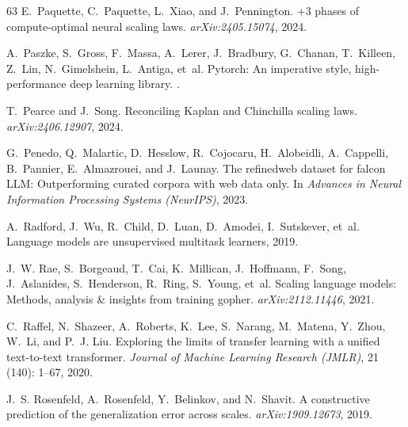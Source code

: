 \documentclass{article}
\theoremstyle{plain}
\theoremstyle{definition}
\theoremstyle{remark}
\begin{document}
\begin{thebibliography}{63}
E.~Paquette, C.~Paquette, L.~Xiao, and J.~Pennington.
+3 phases of compute-optimal neural scaling laws.
\newblock \emph{arXiv:2405.15074}, 2024.

A.~Paszke, S.~Gross, F.~Massa, A.~Lerer, J.~Bradbury, G.~Chanan, T.~Killeen, Z.~Lin, N.~Gimelshein, L.~Antiga, et~al.
\newblock Pytorch: An imperative style, high-performance deep learning library.
.

T.~Pearce and J.~Song.
\newblock Reconciling {K}aplan and {C}hinchilla scaling laws.
\newblock \emph{arXiv:2406.12907}, 2024.

G.~Penedo, Q.~Malartic, D.~Hesslow, R.~Cojocaru, H.~Alobeidli, A.~Cappelli, B.~Pannier, E.~Almazrouei, and J.~Launay.
\newblock The refinedweb dataset for falcon {LLM}: Outperforming curated corpora with web data only.
\newblock In \emph{Advances in Neural Information Processing Systems (NeurIPS)}, 2023.

A.~Radford, J.~Wu, R.~Child, D.~Luan, D.~Amodei, I.~Sutskever, et~al.
\newblock Language models are unsupervised multitask learners, 2019.

J.~W. Rae, S.~Borgeaud, T.~Cai, K.~Millican, J.~Hoffmann, F.~Song, J.~Aslanides, S.~Henderson, R.~Ring, S.~Young, et~al.
\newblock Scaling language models: Methods, analysis \& insights from training gopher.
\newblock \emph{arXiv:2112.11446}, 2021.

C.~Raffel, N.~Shazeer, A.~Roberts, K.~Lee, S.~Narang, M.~Matena, Y.~Zhou, W.~Li, and P.~J. Liu.
\newblock Exploring the limits of transfer learning with a unified text-to-text transformer.
\newblock \emph{Journal of Machine Learning Research (JMLR)}, 21 (140): 1--67, 2020.

J.~S. Rosenfeld, A.~Rosenfeld, Y.~Belinkov, and N.~Shavit.
\newblock A constructive prediction of the generalization error across scales.
\newblock \emph{arXiv:1909.12673}, 2019.


\end{thebibliography}
\end{document}
